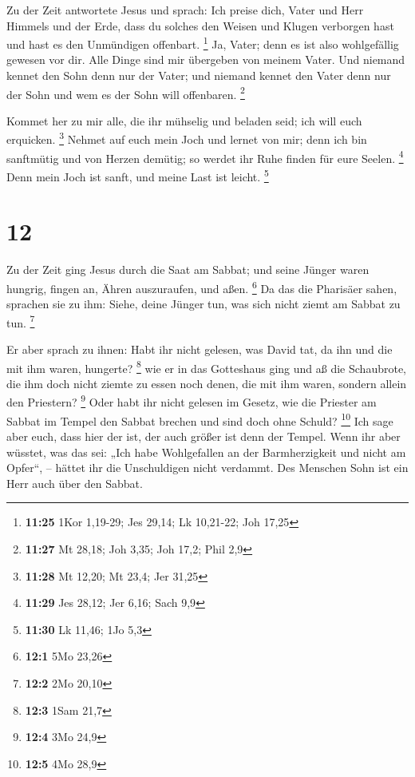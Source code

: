  Zu der Zeit antwortete Jesus und sprach: Ich preise dich,
Vater und Herr Himmels und der Erde, dass du solches den Weisen und
Klugen verborgen hast und hast es den Unmündigen offenbart. \footnote{\textbf{11:25}
  1Kor 1,19-29; Jes 29,14; Lk 10,21-22; Joh 17,25}  Ja,
Vater; denn es ist also wohlgefällig gewesen vor dir.  Alle
Dinge sind mir übergeben von meinem Vater. Und niemand kennet den Sohn
denn nur der Vater; und niemand kennet den Vater denn nur der Sohn und
wem es der Sohn will offenbaren. \footnote{\textbf{11:27} Mt 28,18; Joh
  3,35; Joh 17,2; Phil 2,9}

 Kommet her zu mir alle, die ihr mühselig und beladen seid;
ich will euch erquicken. \footnote{\textbf{11:28} Mt 12,20; Mt 23,4; Jer
  31,25}  Nehmet auf euch mein Joch und lernet von mir;
denn ich bin sanftmütig und von Herzen demütig; so werdet ihr Ruhe
finden für eure Seelen. \footnote{\textbf{11:29} Jes 28,12; Jer 6,16;
  Sach 9,9}  Denn mein Joch ist sanft, und meine Last ist
leicht. \footnote{\textbf{11:30} Lk 11,46; 1Jo 5,3}

\hypertarget{section-8}{%
\section{12}\label{section-8}}

 Zu der Zeit ging Jesus durch die Saat am Sabbat; und seine
Jünger waren hungrig, fingen an, Ähren auszuraufen, und aßen.
\footnote{\textbf{12:1} 5Mo 23,26}  Da das die Pharisäer
sahen, sprachen sie zu ihm: Siehe, deine Jünger tun, was sich nicht
ziemt am Sabbat zu tun. \footnote{\textbf{12:2} 2Mo 20,10}

 Er aber sprach zu ihnen: Habt ihr nicht gelesen, was David
tat, da ihn und die mit ihm waren, hungerte? \footnote{\textbf{12:3}
  1Sam 21,7}  wie er in das Gotteshaus ging und aß die
Schaubrote, die ihm doch nicht ziemte zu essen noch denen, die mit ihm
waren, sondern allein den Priestern? \footnote{\textbf{12:4} 3Mo 24,9}
 Oder habt ihr nicht gelesen im Gesetz, wie die Priester am
Sabbat im Tempel den Sabbat brechen und sind doch ohne Schuld?
\footnote{\textbf{12:5} 4Mo 28,9}  Ich sage aber euch, dass
hier der ist, der auch größer ist denn der Tempel.  Wenn ihr
aber wüsstet, was das sei: „Ich habe Wohlgefallen an der Barmherzigkeit
und nicht am Opfer``, -- hättet ihr die Unschuldigen nicht verdammt.
 Des Menschen Sohn ist ein Herr auch über den Sabbat.

